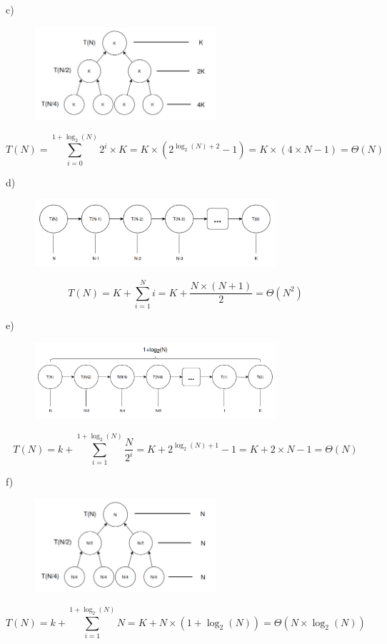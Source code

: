 \documentclass[a4paper,11pt]{article}
\begin{document}
	\newpage
	
	\noindent c)
	
	\begin{figure}[h]
		\centering
		\includegraphics[width=0.6\textwidth]{imgs/2_1-c.png}
	\end{figure}
	\[
		T(N) = \sum_{i=0}^{1 + \log_2(N)} 2^i \times K = K \times (2^{\log_2(N) + 2} - 1) = K \times (4 \times N - 1) = \Theta(N)
	\]
	
	\noindent d)
	
	\begin{figure}[h]
		\centering
		\includegraphics[width=0.8\textwidth]{imgs/2_1-d.png}
	\end{figure}
	\[
		T(N) = K + \sum_{i=1}^{N} i = K + \frac{N \times (N + 1)}{2} = \Theta(N^2)
	\]
	
	\noindent e)
	
	\begin{figure}[h]
		\centering
		\includegraphics[width=0.8\textwidth]{imgs/2_1-e.png}
	\end{figure}
	\[
		T(N) = k + \sum_{i=1}^{1 + \log_2(N)} \frac{N}{2^i} = K + 2^{\log_2(N) + 1} - 1 = K + 2 \times N - 1 = \Theta(N)
	\]
	
	\newpage
	
	\noindent f)
	
	\begin{figure}[h]
		\centering
		\includegraphics[width=0.6\textwidth]{imgs/2_1-f.png}
	\end{figure}
	\[
		T(N) = k + \sum_{i=1}^{1 + \log_2(N)} N = K + N \times (1 + \log_2(N)) = \Theta(N \times \log_2(N))
	\]
	
\end{document}
